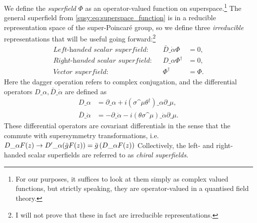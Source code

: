 \documentclass[../main.tex]{subfiles}
\begin{document}
We define the \emph{superfield} \(\Phi\) as an operator-valued function on
superspace.\footnote{For our purposes, it suffices to look at them simply as complex valued functions, but strictly speaking, they are operator-valued in a quantised field theory.} The general superfield from \cref{susy:eq:superspace_function} is in a
reducible representation space of the super-Poincaré group, so we define three
\emph{irreducible} representations that will be useful going forward:\footnote{I will not prove that these in fact are irreducible representations.}
\begin{align}
  \textit{Left-handed scalar superfield:}  &  & \bar{D}\_{\dot\alpha}\Phi & = 0,    \\
  \textit{Right-handed scalar superfield:} &  & D\_{\alpha}\Phi^\dagger   & = 0,    \\
  \label{susy:eq:vector_superfield}
  \textit{Vector superfield:}              &  & \Phi^\dagger              & = \Phi.
\end{align}
Here the dagger operation refers to complex conjugation, and the differential operators \(D\_\alpha, \bar{D}\_{\dot\alpha}\) are defined as
\begin{subequations}
  \begin{align}
    D\_\alpha             & = \partial\_\alpha + i(\sigma\^\mu \theta^\dagger)\_\alpha \partial\_\mu,      \\
    \bar{D}\_{\dot\alpha} & = -\partial\_{\dot\alpha} - i (\theta\sigma\^\mu)\_{\dot\alpha} \partial\_\mu.
  \end{align}
\end{subequations}
These differential operators are covariant differentials in the sense that the commute with supersymmetry transformations, i.e. \(D\_\alpha F(z) \to {D^\prime}\_\alpha (\bar{g} F(z)) = \bar{g} \left(D\_\alpha F(z)\right)\)
Collectively, the left- and right-handed scalar superfields are referred to as \emph{chiral superfields}.
\end{document}
